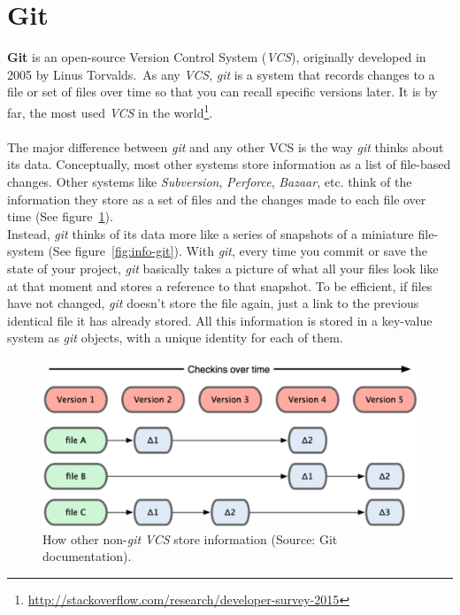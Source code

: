 \documentclass[a4paper, 12pt]{book}
\begin{document}
\section{Git}
\label{sec:git}
\textbf{Git} is an open-source Version Control System (\emph{VCS}), originally developed in 2005 by Linus Torvalds.\
As any \emph{VCS}, \emph{git} is a system that records changes to a file or set of files over time
so that you can recall specific versions later.
It is by far, the most used \emph{VCS} in the world\footnote{\url{http://stackoverflow.com/research/developer-survey-2015}}.\\\\
The major difference between \emph{git} and any other VCS is the way \emph{git} thinks about its data.
Conceptually, most other systems store information as a list of file-based changes. Other systems like \textit{Subversion},
\textit{Perforce}, \textit{Bazaar}, etc. think of the information they store as a set of files and the changes made to each
file over time (See figure~\ref{fig:info-not-git}).\\
Instead, \emph{git} thinks of its data more like a series of snapshots of a miniature file-system (See figure~\ref{fig:info-git}).
With \emph{git}, every time you commit or save the state of your project, \emph{git} basically takes a picture of what all
your files look like at that moment and stores a reference to that snapshot. To be efficient, if files have not changed,
\emph{git} doesn't store the file again, just a link to the previous identical file it has already stored.
All this information is stored in a key-value system as \emph{git} objects, with a unique identity for each of them.
\begin{figure}
  \centering
  \includegraphics[width=12cm, keepaspectratio]{img/deltas-not-git}
  \caption{How other non-\emph{git} \emph{VCS} store information (Source: Git documentation).}
  \label{fig:info-not-git}
\end{figure}
\end{document}
